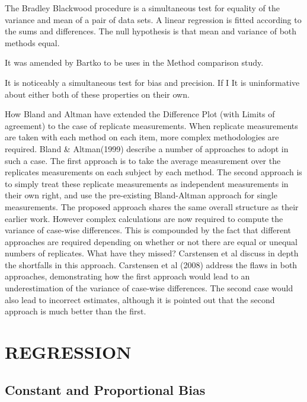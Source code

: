 \documentclass[MAIN.tex]{subfiles}
\begin{document}
The Bradley Blackwood procedure is a simultaneous test for equality of the variance and mean of a pair of data sets. 
A linear regression is fitted according to the sums and differences.
The null hypothesis is that mean and variance of both methods equal.





It was amended by Bartko to be uses in the Method comparison study.

It is noticeably a simultaneous test for bias and precision. If I It is uninformative about either both of these properties on their own.

\newpage
How Bland and Altman have extended the Difference Plot (with Limits of agreement) to the case of replicate measurements.
When replicate measurements are taken with each method on each item, more complex methodologies are required. Bland \& Altman(1999) describe a number of approaches to adopt in such a case. The first approach is to take the average measurement over the replicates measurements on each subject by each method.
The second approach is to simply treat these replicate measurements as independent measurements in their own right, and use the pre-existing Bland-Altman approach for single measurements.
The proposed approach shares the same overall structure as their earlier work. However complex calculations are now required to compute the variance of case-wise differences. This is compounded by the fact that different approaches are required depending on whether or not there are equal or unequal numbers of replicates.
What have they missed? Carstensen et al discuss in depth the shortfalls in this approach.
Carstensen et al (2008) address the flaws in both approaches, demonstrating how the first approach would lead to an underestimation of the variance of case-wise differences. The second case would also lead to incorrect estimates, although it is pointed out that the second approach is much better than the first.


\chapter{REGRESSION}%

\section{Constant and Proportional Bias}
\end{document}
